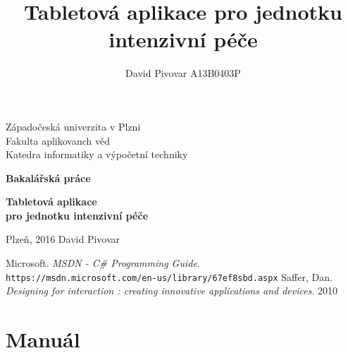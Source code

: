 \documentclass[12pt, a4paper]{report}
\title{Tabletová aplikace pro jednotku intenzivní péče}
\author{David Pivovar A13B0403P}
\begin{document}
\begin{titlepage}

\begin{center}
	
	{\fontsize{22}{0} \selectfont
		Západočeská univerzita v Plzni\\
		Fakulta aplikovanch věd\\
		Katedra informatiky a výpočetní techniky\\
	}
	
	\vfill
	\vfill
	
	{\fontsize{28}{0} \textbf{
		Bakalářská práce\\
	}}
	
	\vfill
	
	{\fontsize{36}{0} \textbf{
		Tabletová aplikace\\pro jednotku intenzivní péče
	}}

\end{center}

\vfill
\vfill
\vfill
\vfill

\begin{flushleft}

	{\fontsize{16}{0} \selectfont
		Plzeň, 2016
		\hfill
		David Pivovar
	}
	
\end{flushleft}

\end{titlepage}




\tableofcontents

\setlength{\parskip}{1em}






%
%


\setlength{\parskip}{0em}

\begin{thebibliography}{9}
	 Microsoft. \textit{MSDN - C\# Programming Guide}. \\\texttt{https://msdn.microsoft.com/en-us/library/67ef8sbd.aspx}
	 Saffer, Dan. \textit{Designing for interaction : creating innovative applications and devices}. 2010
\end{thebibliography}

\listoffigures
{}

\chapter*{Manuál}

\end{document}
